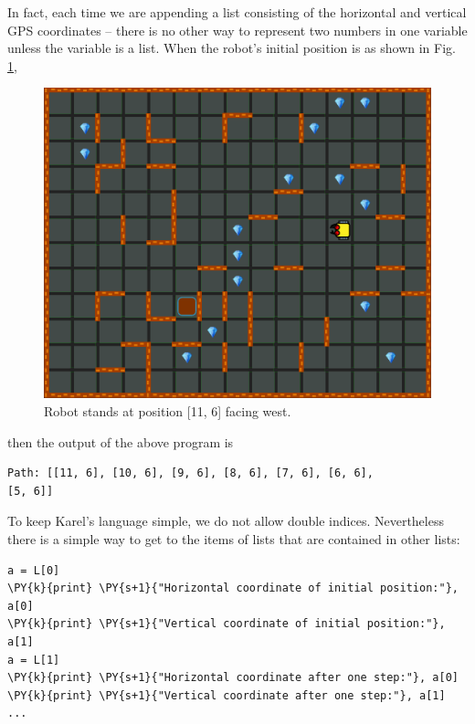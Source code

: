 \noindent
In fact, each time we are appending a list consisting of the horizontal and 
vertical GPS coordinates -- there is no other way to represent two numbers 
in one variable unless the variable is a list. When the robot's initial position 
is as shown in Fig. \ref{fig:list-1},
\newpage

\begin{figure}[!ht]
\begin{center}
\includegraphics[height=0.4\textwidth]{img/lists-1.png}
\vspace{-0mm}
\caption{Robot stands at position [11, 6] facing west.}
\label{fig:list-1}
\end{center}
\end{figure}

\noindent
then the output of the above program is\\

\begin{ybox}
\begin{Verbatim}[commandchars=\\\{\}]
Path: [[11, 6], [10, 6], [9, 6], [8, 6], [7, 6], [6, 6], 
[5, 6]]
\end{Verbatim}
\end{ybox}
\vspace{6mm}

\noindent
To keep Karel's language simple, we do not allow double indices. Nevertheless
there is a simple way to get to the items of lists that are contained in other lists:\\

\begin{bbox}
\begin{Verbatim}[commandchars=\\\{\}]
a = L[0]
\PY{k}{print} \PY{s+1}{"Horizontal coordinate of initial position:"}, a[0]
\PY{k}{print} \PY{s+1}{"Vertical coordinate of initial position:"}, a[1]
a = L[1]
\PY{k}{print} \PY{s+1}{"Horizontal coordinate after one step:"}, a[0]
\PY{k}{print} \PY{s+1}{"Vertical coordinate after one step:"}, a[1]
...
\end{Verbatim}
\end{bbox}


